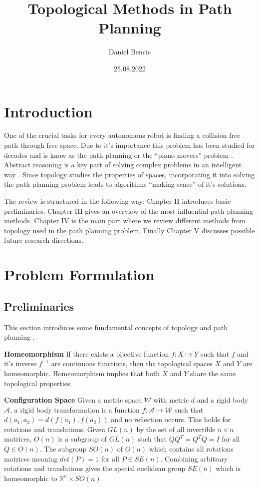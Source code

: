 \documentclass[11pt,twocolumn]{article}
\title{Topological Methods in Path Planning} \author{Daniel Bencic}
\date{25.08.2022}
\begin{document}
\maketitle

\section{Introduction} One of the crucial tasks for every autonomous
robot is finding a collision free path through free space. Due to it's
importance this problem has been studied for decades and is know as
the path planning or the ``piano movers'' problem
\cite{schwartzPianoMoversProblem1983a,schwartzPianoMoversProblem1983b}.
Abstract reasoning is a key part of solving complex problems in an
intelligent way \cite{zuckerGroundedTheoryAbstraction2003}. Since
topology studies the properties of spaces, incorporating it into
solving the path planning problem leads to algorithms ``making sense''
of it's solutions.

The review is structured in the following way: Chapter II introduces
basic preliminaries. Chapter III gives an overview of the most
influential path planning methods. Chapter IV is the main part where
we review different methods from topology used in the path planning
problem. Finally Chapter V discusses possible future research
directions.

\section{Problem Formulation}
\subsection*{Preliminaries} This section introduces some fundamental
concepts of topology and path planning
\cite{munkresTopology2014,lavallePlanningAlgorithms2006,hatcherAlgebraicTopology2002}.

\textbf{Homeomorphism} If there exists a bijective function
\(f: X \mapsto Y\) such that \(f\) and it's inverse \(f^{-1}\) are
continuous functions, then the topological spaces \(X\) and \(Y\) are
homeomorphic. Homeomorphism implies that both \(X\) and \(Y\) share
the same topological properties.

\textbf{Configuration Space} Given a metric space \(\mathcal{W}\) with
metric \(d\) and a rigid body \(\mathcal{A}\), a rigid body
transformation is a function \(f: \mathcal{A} \mapsto \mathcal{W}\)
such that \(d(a_{1}, a_{2}) = d(f(a_{1}), f(a_{2}))\) and no
reflection occurs. This holds for rotations and translations. Given
\(GL(n)\) by the set of all invertible \(n \times n\) matrices,
\(O(n)\) is a subgroup of \(GL(n)\) such that \(QQ^{T} = Q^{T}Q = I\)
for all \(Q \in O(n)\). The subgroup \(SO(n)\) of \(O(n)\) which
contains all rotations matrices meaning \(det(P) = 1\) for all
\(P \in SE(n)\). Combining arbitrary rotations and translations gives
the special euclidean group \(SE(n)\) which is homeomorphic to
\(\mathbb{R}^{n} \times SO(n)\).
\end{document}
